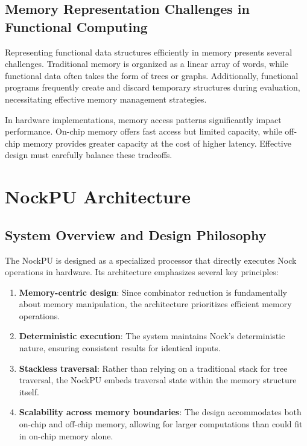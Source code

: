 \documentclass[twoside]{article}
\begin{document}
\subsection{Memory Representation Challenges in Functional Computing}

Representing functional data structures efficiently in memory presents several challenges. Traditional memory is organized as a linear array of words, while functional data often takes the form of trees or graphs. Additionally, functional programs frequently create and discard temporary structures during evaluation, necessitating effective memory management strategies.

In hardware implementations, memory access patterns significantly impact performance. On-chip memory offers fast access but limited capacity, while off-chip memory provides greater capacity at the cost of higher latency. Effective design must carefully balance these tradeoffs.

\section{NockPU Architecture}

\subsection{System Overview and Design Philosophy}

The NockPU is designed as a specialized processor that directly executes Nock operations in hardware. Its architecture emphasizes several key principles:

\begin{enumerate}
  \item \textbf{Memory-centric design}: Since combinator reduction is fundamentally about memory manipulation, the architecture prioritizes efficient memory operations.
  \item \textbf{Deterministic execution}: The system maintains Nock's deterministic nature, ensuring consistent results for identical inputs.
  \item \textbf{Stackless traversal}: Rather than relying on a traditional stack for tree traversal, the NockPU embeds traversal state within the memory structure itself.
  \item \textbf{Scalability across memory boundaries}: The design accommodates both on-chip and off-chip memory, allowing for larger computations than could fit in on-chip memory alone.
\end{enumerate}
\end{document}
